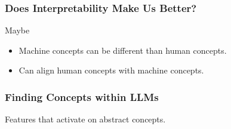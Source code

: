 \subsubsection{Does Interpretability Make Us Better?}
\begin{example}
    Maybe
    \begin{itemize}
        \item Machine concepts can be different than human concepts. 
        \item Can align human concepts with machine concepts.
    \end{itemize}
\end{example}
\newpage

\subsubsection{Finding Concepts within LLMs}
\begin{example} Features that activate on abstract concepts. 
\end{example}
